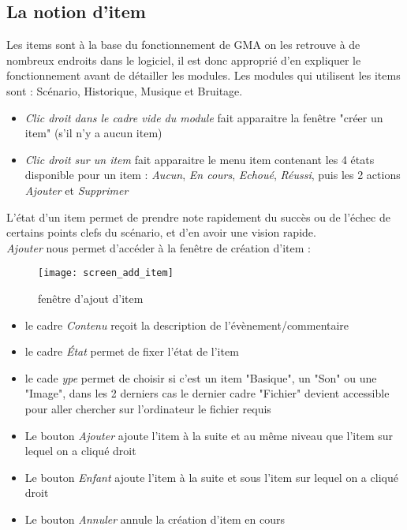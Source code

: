 \documentclass[12pt]{article}
\begin{document}
\subsection{La notion d'item}\label{item}
Les items sont à la base du fonctionnement de GMA on les retrouve à de nombreux endroits dans le logiciel, il est donc approprié d'en expliquer le fonctionnement avant de détailler les modules.
Les modules qui utilisent les items sont : Scénario, Historique, Musique et Bruitage.

\begin{itemize}
    \item\emph{Clic droit dans le cadre vide du module} fait apparaitre la fenêtre "créer un item" (s'il n'y a aucun item)
    \item\emph{Clic droit sur un item} fait apparaitre le menu item contenant les 4 états disponible pour un item : \emph{Aucun}, \emph{En cours}, \emph{Echoué}, \emph{Réussi}, puis les 2 actions \emph{Ajouter} et \emph{Supprimer}
\end{itemize}
L'état d'un item permet de prendre note rapidement du succès ou de l'échec de certains points clefs du scénario, et d'en avoir une vision rapide.\\

\emph{Ajouter} nous permet d'accéder à la fenêtre de création d'item :
\begin{figure}[h]
    \texttt{[image: screen\_add\_item]}
    \caption{fenêtre d'ajout d'item}
\end{figure}
\begin{itemize}
    \item le cadre \emph{Contenu} reçoit la description de l'évènement/commentaire
    \item le cadre \emph{État} permet de fixer l'état de l'item
    \item le cade \emph{ype} permet de choisir si c'est un item "Basique", un "Son" ou une "Image", dans les 2 derniers cas le dernier cadre "Fichier" devient accessible pour aller chercher sur l'ordinateur le fichier requis
    \item Le bouton \emph{Ajouter} ajoute l'item à la suite et au même niveau que l'item sur lequel on a cliqué droit
    \item Le bouton \emph{Enfant} ajoute l'item à la suite et sous l'item sur lequel on a cliqué droit
    \item Le bouton \emph{Annuler} annule la création d'item en cours
\end{itemize}
\end{document}
